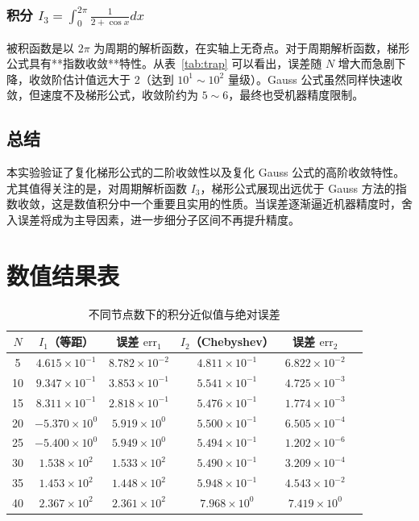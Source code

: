 \documentclass[12pt,a4paper]{article}
\begin{document}
\subsubsection{积分 \(I_3=\int_0^{2\pi} \frac{1}{2+\cos x}dx\)}
被积函数是以 \(2\pi\) 为周期的解析函数，在实轴上无奇点。对于周期解析函数，梯形公式具有**指数收敛**特性。从表~\ref{tab:trap} 可以看出，误差随 \(N\) 增大而急剧下降，收敛阶估计值远大于 2（达到 \(10^1\sim10^2\) 量级）。Gauss 公式虽然同样快速收敛，但速度不及梯形公式，收敛阶约为 \(5\sim6\)，最终也受机器精度限制。

\subsection{总结}

本实验验证了复化梯形公式的二阶收敛性以及复化 Gauss 公式的高阶收敛特性。尤其值得关注的是，对周期解析函数 \(I_3\)，梯形公式展现出远优于 Gauss 方法的指数收敛，这是数值积分中一个重要且实用的性质。当误差逐渐逼近机器精度时，舍入误差将成为主导因素，进一步细分子区间不再提升精度。

\newpage
\appendix
\section{数值结果表}

\begin{table}[htbp]
\centering
\caption{不同节点数下的积分近似值与绝对误差}
\label{tab:interp_int}
\begin{tabular}{c c c c c c}
\toprule
\(N\) & \(I_1\)（等距） & 误差 \(\mathrm{err}_1\) & \(I_2\)（Chebyshev） & 误差 \(\mathrm{err}_2\) \\
\midrule
5  & \(4.615\times10^{-1}\) & \(8.782\times10^{-2}\) & \(4.811\times10^{-1}\) & \(6.822\times10^{-2}\) \\
10 & \(9.347\times10^{-1}\) & \(3.853\times10^{-1}\) & \(5.541\times10^{-1}\) & \(4.725\times10^{-3}\) \\
15 & \(8.311\times10^{-1}\) & \(2.818\times10^{-1}\) & \(5.476\times10^{-1}\) & \(1.774\times10^{-3}\) \\
20 & \(-5.370\times10^{0}\)  & \(5.919\times10^{0}\)  & \(5.500\times10^{-1}\) & \(6.505\times10^{-4}\) \\
25 & \(-5.400\times10^{0}\)  & \(5.949\times10^{0}\)  & \(5.494\times10^{-1}\) & \(1.202\times10^{-6}\) \\
30 & \(1.538\times10^{2}\)   & \(1.533\times10^{2}\)   & \(5.490\times10^{-1}\) & \(3.209\times10^{-4}\) \\
35 & \(1.453\times10^{2}\)   & \(1.448\times10^{2}\)   & \(5.948\times10^{-1}\) & \(4.543\times10^{-2}\) \\
40 & \(2.367\times10^{2}\)   & \(2.361\times10^{2}\)   & \(7.968\times10^{0}\)  & \(7.419\times10^{0}\) \\
\bottomrule
\end{tabular}
\end{table}
\end{document}
